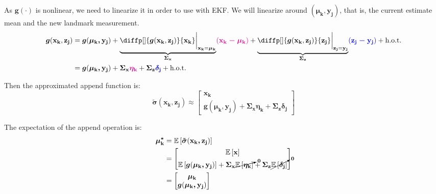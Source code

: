 \documentclass[12pt]{article}
\newcommand{\bvec}[1]{\boldsymbol{\mathbf{#1}}} %
\newcommand{\mat}[1]{\boldsymbol{\mathbf{#1}}}
\newcommand{\brac}[1]{\left[#1\right]} %
\newcommand{\mb}[1]{{\boldsymbol{#1}}} %
\newcommand{\expv}[1]{\mathbb{E}\brac{#1}} %
\newcommand{\hot}{\text{h.o.t.}}
\newcommand{\blue}[1]{\color{blue}#1\color{black}}
\newcommand{\magenta}[1]{\color{magenta}#1\color{black}}
\begin{document}
As $\mb{g}(\cdot)$ is nonlinear, we need to linearize it in order to use with 
EKF. We will linearize around $(\bvec{\mu_k}, \bvec{y_j})$, that is, 
the current estimate mean and the new landmark measurement.
\begin{equation}
    \begin{aligned}
    \mb{g}(\bvec{x_k}, \bvec{z_j}) &= 
    \mb{g}(\bvec{\mu_k, y_j}) + \underbrace{\diffp[]{\mb{g}(\bvec{x_k}, \bvec{z_j})}{\bvec{x_k}} 
    \bigg\lvert_{\bvec{x_k} = \bvec{\mu_k}}}_{\mat{\Sigma_x}} 
    \magenta{(\bvec{x_k - \mu_k})} + \underbrace{\diffp[]{\mb{g}
    (\bvec{x_k}, \bvec{z_j})}{\bvec{z_j}} \bigg\lvert_{
        \bvec{z_j} = \bvec{y_j}}}_{\mat{\Sigma_z}} 
    \blue{(\bvec{z_j - y_j})} + \hot \\
    &= \mb{g}(\bvec{\mu_k, y_j}) + \mat{\Sigma_x} \magenta{\bvec{\eta_k}} 
    + \mat{\Sigma_z} \blue{\bvec{\delta_j}} + \hot
    \end{aligned}
\end{equation}

Then the approximated append function is:
\begin{equation}
    \mb{\tilde{\sigma}}(\bvec{x_k}, \bvec{z_j}) \approx \begin{bmatrix}
       \bvec{x_k} \\
       \mb{g}(\bvec{\mu_k, y_j}) + \mat{\Sigma_x \eta_k + \Sigma_z \delta_j}
    \end{bmatrix}
\label{eq:ekf-slam-append-approx}
\end{equation}

The expectation of the append operation is:
\begin{equation}
\begin{aligned}
    \bvec{\mu_k^*} &= \expv{\bvec{\tilde{\sigma}}(\bvec{x_k, z_j})}\\
    &= \begin{bmatrix}
        \expv{\bvec{x}} \\
        \expv{\mb{g}(\bvec{\mu_k, y_j})} + \mat{\Sigma_x} 
        \cancelto{\bvec{0}}{\expv{\bvec{\eta_k}}} + \mat{\Sigma_z} 
        \cancelto{\bvec{0}}{\expv{\bvec{\delta_j}}}
    \end{bmatrix}\\
    &= \begin{bmatrix}
        \bvec{\mu_k} \\
        \mb{g}(\bvec{\mu_k, y_j})
    \end{bmatrix}
\end{aligned}
\end{equation}
\end{document}
